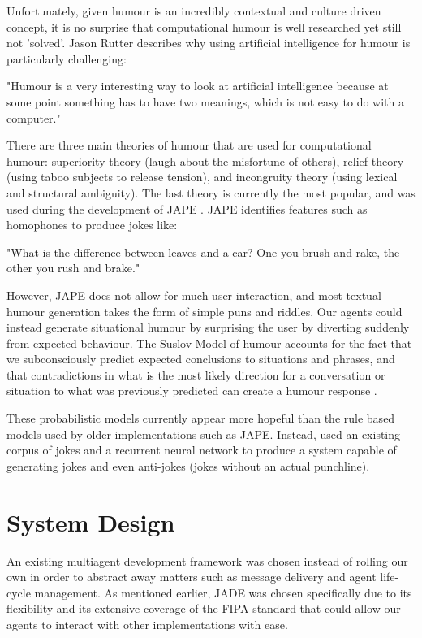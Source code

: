 \documentclass{article}
\begin{document}
Unfortunately, given humour is an incredibly contextual and culture driven concept, it is no surprise that computational humour is well researched yet still not 'solved'. Jason Rutter describes why using artificial intelligence for humour is particularly challenging:

\begin{displayquote}
"Humour is a very interesting way to look at artificial intelligence because at some point something has to have two meanings, which is not easy to do with a computer." \cite{jasonrutter}
\end{displayquote}

There are three main theories of humour that are used for computational humour: superiority theory (laugh about the misfortune of others), relief theory (using taboo subjects to release tension), and incongruity theory (using lexical and structural ambiguity). The last theory is currently the most popular, and was used during the development of JAPE \cite{jape}. JAPE identifies features such as homophones to produce jokes like:

\begin{displayquote}
	"What is the difference between leaves and a car? One you brush and rake, the other you rush and brake."
\end{displayquote}

However, JAPE does not allow for much user interaction, and most textual humour generation takes the form of simple puns and riddles. Our agents could instead generate situational humour by surprising the user by diverting suddenly from expected behaviour. The Suslov Model of humour accounts for the fact that we subconsciously predict expected conclusions to situations and phrases, and that contradictions in what is the most likely direction for a conversation or situation to what was previously predicted can create a humour response \cite{suslov}.

These probabilistic models currently appear more hopeful than the rule based models used by older implementations such as JAPE. Instead, \cite{humourrnn} used an existing corpus of jokes and a recurrent neural network to produce a system capable of generating jokes and even anti-jokes (jokes without an actual punchline). 

\section{System Design}

An existing multiagent development framework was chosen instead of rolling our own in order to abstract away matters such as message delivery and agent life-cycle management. As mentioned earlier, JADE was chosen specifically due to its flexibility and its extensive coverage of the FIPA standard that could allow our agents to interact with other implementations with ease. 
\end{document}

